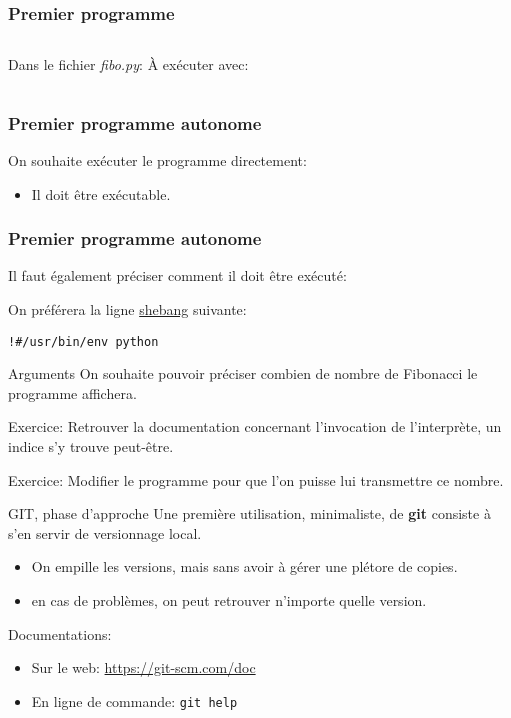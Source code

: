 \documentclass{beamer}
\begin{document}
\begin{frame}[fragile]\frametitle{Premier programme}
  \begin{columns}
    Dans le fichier {\it fibo.py}:\newline
    \fbox{}
    À exécuter avec:
    \fbox{}
  \end{columns}
\end{frame}

\begin{frame}[fragile]\frametitle{Premier programme autonome}
  On souhaite exécuter le programme directement:
  \begin{itemize}
  \item Il doit être exécutable.
  \end{itemize}
  \fbox{}
\end{frame}

\begin{frame}[fragile]\frametitle{Premier programme autonome}
  Il faut également préciser comment il doit être exécuté:
  \fbox{}

  On préférera la ligne \href{https://en.wikipedia.org/wiki/Shebang_(Unix)}{shebang} suivante:
\begin{verbatim}
!#/usr/bin/env python
\end{verbatim}
\end{frame}

\begin{frame}{Arguments}
  On souhaite pouvoir préciser combien de nombre de Fibonacci le programme affichera.

  Exercice: Retrouver la documentation concernant l'invocation de l'interprète, un indice s'y trouve peut-être.
  
  Exercice: Modifier le programme pour que l'on puisse lui transmettre ce nombre. 
\end{frame}

\begin{frame}{GIT, phase d'approche}
  Une première utilisation, minimaliste, de {\bf git} consiste à s'en servir de versionnage local.
  \begin{itemize}
  \item On empille les versions, mais sans avoir à gérer une plétore de copies.
  \item en cas de problèmes, on peut retrouver n'importe quelle version.
  \end{itemize}
  Documentations:
  \begin{itemize}
  \item Sur le web: \url{https://git-scm.com/doc}
  \item En ligne de commande: {\tt git help}
  \end{itemize}
\end{frame}
\end{document}
